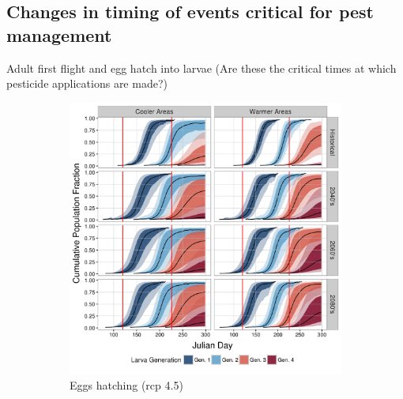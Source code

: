 \documentclass[12pt]{article}
\theoremstyle{plain}
\theoremstyle{definition}
\theoremstyle{definition}
\begin{document}
\subsection{Changes in timing of events critical for pest management}
Adult first flight and egg hatch into larvae (Are these the critical times at which pesticide applications are made?) 

\begin{figure}[h!]
    \centering
    \begin{subfigure}[b]{0.48\textwidth}
        \includegraphics[width=\textwidth]{figures/plot_eggHatch_rcp45}
        \caption{Eggs hatching (rcp 4.5)}
        \label{fig:Eggs_Hatch_45)}
    \end{subfigure}
    ~ %
    \begin{subfigure}[b]{0.48\textwidth}

\end{subfigure}
\end{figure}
\end{document}
